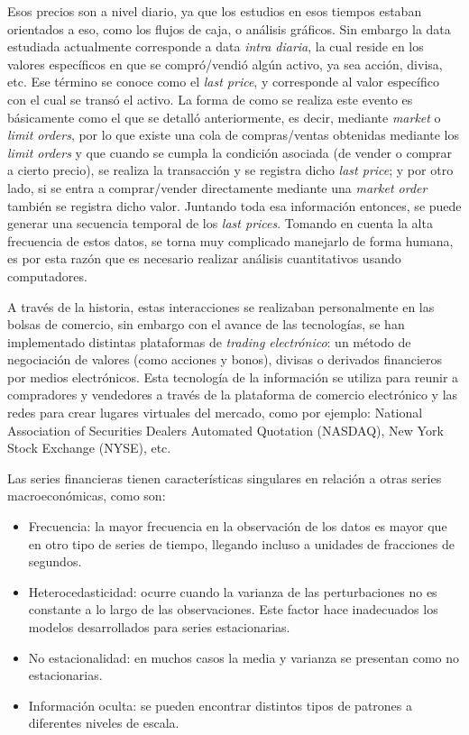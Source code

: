 Esos precios son a nivel diario, ya que los estudios en esos tiempos estaban orientados a eso, como los flujos de caja, o análisis gráficos.
Sin embargo la data estudiada actualmente corresponde a data \emph{intra diaria}, la cual reside en los valores
específicos en que se compró/vendió algún activo, ya sea acción, divisa, etc. Ese término se conoce como el \emph{last price}, y corresponde
al valor específico con el cual se transó el activo. La forma de como se realiza este evento es básicamente como el que se detalló anteriormente,
es decir, mediante \emph{market} o \emph{limit orders}, por lo que existe una cola de compras/ventas obtenidas mediante los \emph{limit orders} y que cuando
se cumpla la condición asociada (de vender o comprar a cierto precio), se realiza la transacción y se registra dicho \emph{last price}; 
y por otro lado, si se entra a comprar/vender directamente mediante una \emph{market order} también se registra dicho valor. 
Juntando toda esa información entonces, se puede generar una secuencia temporal de los \emph{last prices}. Tomando en cuenta la alta frecuencia de estos datos,
se torna muy complicado manejarlo de forma humana, es por esta razón que es necesario realizar análisis cuantitativos usando computadores.

A través de la historia, estas interacciones se realizaban personalmente en las bolsas de comercio, sin embargo con el avance de las tecnologías,
se han implementado distintas plataformas de \emph{trading electrónico}: un método de negociación de valores (como acciones y bonos), divisas o derivados 
financieros por medios electrónicos. Esta tecnología de la información se utiliza para reunir a compradores y vendedores a través de la plataforma de 
comercio electrónico y las redes para crear lugares virtuales del mercado, como por ejemplo: National Association of Securities Dealers Automated 
Quotation (NASDAQ), New York Stock Exchange (NYSE), etc.

Las series financieras tienen características singulares en relación a otras series macroeconómicas, como son: 
\begin{itemize}
	\item Frecuencia: la mayor frecuencia en la observación de los datos es mayor que en otro tipo de series de tiempo, llegando incluso
		a unidades de fracciones de segundos.
	\item Heterocedasticidad: ocurre cuando la varianza de las perturbaciones no es constante a lo largo de las observaciones.
		Este factor hace inadecuados los modelos desarrollados para series estacionarias.
	\item No estacionalidad: en muchos casos la media y varianza se presentan como no estacionarias.
	\item Información oculta: se pueden encontrar distintos tipos de patrones a diferentes niveles de escala.
\end{itemize}


